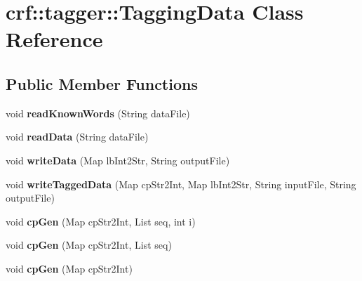 \hypertarget{classcrf_1_1tagger_1_1TaggingData}{
\section{crf::tagger::TaggingData Class Reference}
\label{classcrf_1_1tagger_1_1TaggingData}
}
\subsection*{Public Member Functions}
\begin{DoxyCompactItemize}
\item 
\hypertarget{classcrf_1_1tagger_1_1TaggingData_a67700b3f5f8e9fc1bccc3d187584401f}{
void {\bfseries readKnownWords} (String dataFile)}
\label{classcrf_1_1tagger_1_1TaggingData_a67700b3f5f8e9fc1bccc3d187584401f}

\item 
\hypertarget{classcrf_1_1tagger_1_1TaggingData_aa3757de4d1f8d98535748294e1c74a74}{
void {\bfseries readData} (String dataFile)}
\label{classcrf_1_1tagger_1_1TaggingData_aa3757de4d1f8d98535748294e1c74a74}

\item 
\hypertarget{classcrf_1_1tagger_1_1TaggingData_a958768ab1621accd8c8ea93f99ee6094}{
void {\bfseries writeData} (Map lbInt2Str, String outputFile)}
\label{classcrf_1_1tagger_1_1TaggingData_a958768ab1621accd8c8ea93f99ee6094}

\item 
\hypertarget{classcrf_1_1tagger_1_1TaggingData_a084906055eb951fd9280b0ceecac2755}{
void {\bfseries writeTaggedData} (Map cpStr2Int, Map lbInt2Str, String inputFile, String outputFile)}
\label{classcrf_1_1tagger_1_1TaggingData_a084906055eb951fd9280b0ceecac2755}

\item 
\hypertarget{classcrf_1_1tagger_1_1TaggingData_a5b20629f598d619be56c4672b123cd7c}{
void {\bfseries cpGen} (Map cpStr2Int, List seq, int i)}
\label{classcrf_1_1tagger_1_1TaggingData_a5b20629f598d619be56c4672b123cd7c}

\item 
\hypertarget{classcrf_1_1tagger_1_1TaggingData_a2a334b2a73023173920ec2ee80d7fdf4}{
void {\bfseries cpGen} (Map cpStr2Int, List seq)}
\label{classcrf_1_1tagger_1_1TaggingData_a2a334b2a73023173920ec2ee80d7fdf4}

\item 
\hypertarget{classcrf_1_1tagger_1_1TaggingData_af76c6a5c7651008736131b6c028809cb}{
void {\bfseries cpGen} (Map cpStr2Int)}
\label{classcrf_1_1tagger_1_1TaggingData_af76c6a5c7651008736131b6c028809cb}

\end{DoxyCompactItemize}
